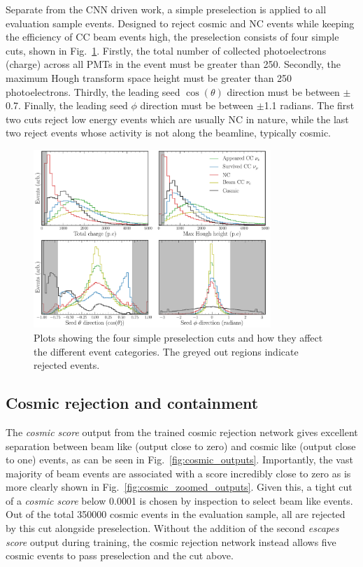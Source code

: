 Separate from the CNN driven work, a simple preselection is applied to all evaluation sample
events. Designed to reject cosmic and NC events while keeping the efficiency of CC beam events
high, the preselection consists of four simple cuts, shown in Fig.~\ref{fig:explore_simple_cuts}.
Firstly, the total number of collected photoelectrons (charge) across all PMTs in the event must
be greater than 250. Secondly, the maximum Hough transform space height must be greater than 250
photoelectrons. Thirdly, the leading seed $\cos(\theta)$ direction must be between $\pm$0.7.
Finally, the leading seed $\phi$ direction must be between $\pm$1.1 radians. The first two cuts
reject low energy events which are usually NC in nature, while the last two reject events whose
activity is not along the beamline, typically cosmic.

\begin{figure} %
    \includegraphics[width=0.8\textwidth]{diagrams/7-results/explore_simple_cuts.pdf}
    \caption[Plots detailing evaluation sample preselection cuts]
    {Plots showing the four simple preselection cuts and how they affect the different event
        categories. The greyed out regions indicate rejected events.}
    \label{fig:explore_simple_cuts}
\end{figure}

\subsection{Cosmic rejection and containment} %
\label{sec:results_eval_cosmic} %

The \emph{cosmic score} output from the trained cosmic rejection network gives excellent
separation between beam like (output close to zero) and cosmic like (output close to one) events,
as can be seen in Fig.~\ref{fig:cosmic_outputs}. Importantly, the vast majority of beam events are
associated with a score incredibly close to zero as is more clearly shown in
Fig.~\ref{fig:cosmic_zoomed_outputs}. Given this, a tight cut of a \emph{cosmic score} below
0.0001 is chosen by inspection to select beam like events. Out of the total 350000 cosmic events
in the evaluation sample, all are rejected by this cut alongside preselection. Without the
addition of the second \emph{escapes score} output during training, the cosmic rejection network
instead allows five cosmic events to pass preselection and the cut above.

